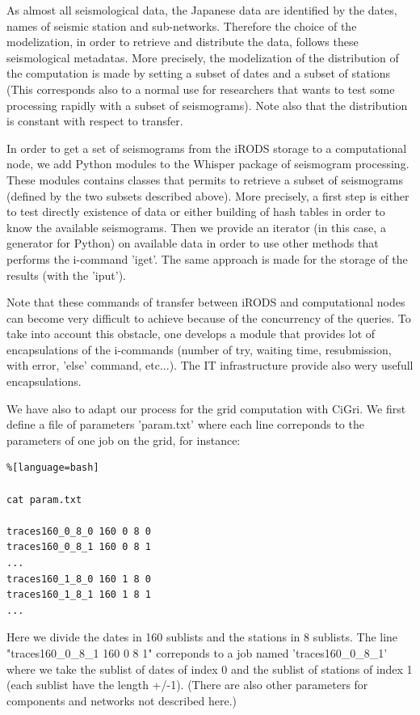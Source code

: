 \documentclass[a4paper, 10pt]{article}
\begin{document}
\begin{multicols}{2}
As almost all seismological data, the Japanese data are identified by the dates, names of seismic station and sub-networks. Therefore
the choice of the modelization, in order to retrieve and distribute the data, follows these seismological metadatas.
More precisely, the modelization of the distribution of the computation is made by setting a subset of dates and a subset of stations 
(This corresponds also to a normal use for researchers that wants to test some processing rapidly with a subset of seismograms).
Note also that the distribution is constant with respect to transfer.


In order to get a set of seismograms from the iRODS storage  to a computational node, we add Python modules to the Whisper package of seismogram processing.
These modules contains classes that permits to retrieve a subset of seismograms (defined by the two subsets described above). More precisely, a first step is either to test directly existence of data or either building of hash tables in order to know the available seismograms.
Then we provide an iterator (in this case, a generator for Python) on available data in order to use other methods that performs the i-command
'iget'. The same approach is made for the storage of the results (with the 'iput').

Note that these commands of transfer between iRODS and computational nodes can become very difficult to achieve because of the concurrency of the queries.
To take into account this obstacle, one develops a module that provides lot of encapsulations of the i-commands (number of try, waiting time,
resubmission, with error, 'else' command,  etc...). The IT infrastructure provide also wery usefull encapsulations.


We have also to adapt our process for the grid computation with CiGri. We first define a file of parameters 'param.txt' where
each line correponds to the parameters of one job on the grid, for instance:

\begin{lstlisting}%[language=bash]

cat param.txt

traces160_0_8_0 160 0 8 0
traces160_0_8_1 160 0 8 1
...
traces160_1_8_0 160 1 8 0
traces160_1_8_1 160 1 8 1
...
\end{lstlisting}

Here we divide the dates in 160 sublists and the stations in 8 sublists. 
The line "traces160\_0\_8\_1 160 0 8 1" correponds to a job named 'traces160\_0\_8\_1' where
we take the sublist of dates of index 0 and the sublist of stations of index 1 (each sublist have the length +/-1).
(There are also other parameters for components and networks not described here.) 



\end{multicols}
\end{document}
